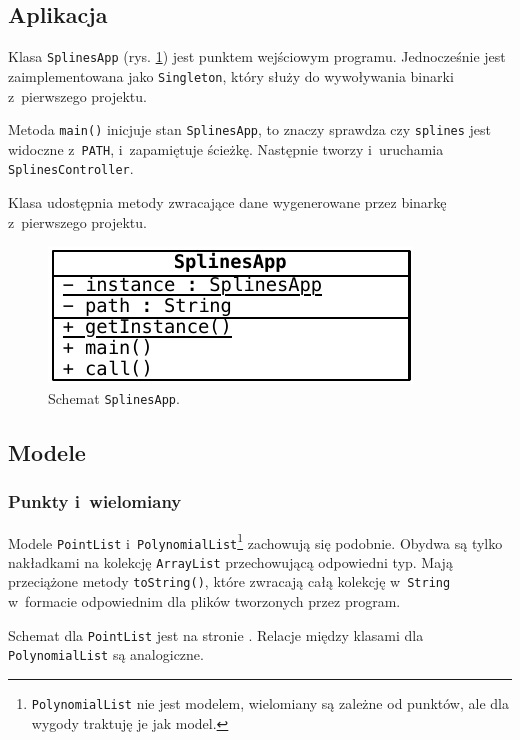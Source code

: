 \documentclass[10pt,a4paper]{article}
\newcommand{\f}[1]{\texttt{#1}}
\begin{document}
\subsection{Aplikacja}

Klasa \f{SplinesApp} (rys. \ref{fig:aplikacja-szczegolowo}) jest punktem
wejściowym programu. Jednocześnie jest zaimplementowana jako \f{Singleton},
który służy do wywoływania binarki z~pierwszego projektu.

Metoda \f{main()} inicjuje stan \f{SplinesApp}, to znaczy sprawdza czy
\f{splines} jest widoczne z~\f{PATH}, i~zapamiętuje ścieżkę. Następnie tworzy
i~uruchamia \f{SplinesController}.

Klasa udostępnia metody zwracające dane wygenerowane przez binarkę z~pierwszego
projektu.

\begin{figure}[hb]
  \centering
  \includegraphics{figury/aplikacja-szczegolowo}
  \caption{Schemat \f{SplinesApp}.}
  \label{fig:aplikacja-szczegolowo}
\end{figure}

\subsection{Modele}

\subsubsection{Punkty i~wielomiany}

Modele \f{PointList} i~\f{PolynomialList}\footnote{\f{PolynomialList} nie jest
modelem, wielomiany są zależne od punktów, ale dla wygody traktuję je jak
model.} zachowują się podobnie. Obydwa są tylko nakładkami na kolekcję
\f{ArrayList} przechowującą odpowiedni typ. Mają przeciążone metody
\f{toString()}, które zwracają całą kolekcję w~\f{String} w~formacie
odpowiednim dla plików tworzonych przez program.

Schemat dla \f{PointList} jest na stronie \pageref{fig:punkty-szczegolowo}.
Relacje między klasami dla \f{PolynomialList} są analogiczne.
\end{document}
